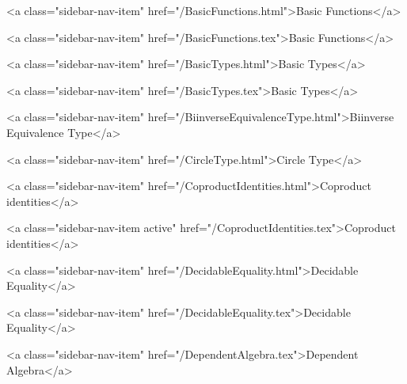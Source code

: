       
    
      
        
          <a class="sidebar-nav-item" href="/BasicFunctions.html">Basic Functions</a>
        
      
    
      
        
          <a class="sidebar-nav-item" href="/BasicFunctions.tex">Basic Functions</a>
        
      
    
      
        
          <a class="sidebar-nav-item" href="/BasicTypes.html">Basic Types</a>
        
      
    
      
        
          <a class="sidebar-nav-item" href="/BasicTypes.tex">Basic Types</a>
        
      
    
      
        
          <a class="sidebar-nav-item" href="/BiinverseEquivalenceType.html">Biinverse Equivalence Type</a>
        
      
    
      
        
          <a class="sidebar-nav-item" href="/CircleType.html">Circle Type</a>
        
      
    
      
        
          <a class="sidebar-nav-item" href="/CoproductIdentities.html">Coproduct identities</a>
        
      
    
      
        
          <a class="sidebar-nav-item active" href="/CoproductIdentities.tex">Coproduct identities</a>
        
      
    
      
        
          <a class="sidebar-nav-item" href="/DecidableEquality.html">Decidable Equality</a>
        
      
    
      
        
          <a class="sidebar-nav-item" href="/DecidableEquality.tex">Decidable Equality</a>
        
      
    
      
        
          <a class="sidebar-nav-item" href="/DependentAlgebra.tex">Dependent Algebra</a>
        
